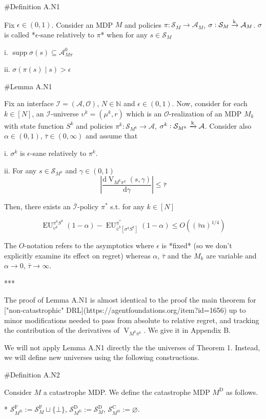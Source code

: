 \documentclass[a4paper]{article}
\DeclareMathOperator{\Supp}{supp}
\newcommand{\AP}[1]{\left(#1\right)}
\newcommand{\AB}[1]{\left[#1\right]}
\newcommand{\D}{\mathrm{d}}
\newcommand{\Nats}{\mathbb{N}}
\newcommand{\Abs}[1]{\left\vert #1 \right\vert}
\newcommand{\M}{\xrightarrow{\textnormal{k}}}
\newcommand{\Ob}{\mathcal{O}}
\newcommand{\A}{\mathcal{A}}
\newcommand{\St}{\mathcal{S}}
\newcommand{\In}{\mathcal{I}}
\newcommand{\Adi}{{\bar{\In}}}
\newcommand{\RMC}{\mathrm{C}}
\newcommand{\RMD}{\mathrm{D}}
\newcommand{\RMF}{\mathrm{F}}
\newcommand{\SF}{\St^{\RMF}}
\newcommand{\SD}{\St^{\RMD}}
\newcommand{\SC}{\St^{\RMC}}
\newcommand{\MD}{M^{\RMD}}
\newcommand{\V}{\operatorname{V}}
\newcommand{\EU}{\operatorname{EU}}
\begin{document}
\#Definition A.N1

Fix $\epsilon\in(0,1)$. Consider an MDP $M$ and policies $\pi: \St_M \rightarrow \A_M$, $\sigma: \St_M \M \A_M$. $\sigma$ is called *$\epsilon$-sane relatively to $\pi$* when for any $s \in \St_M$

i. $\Supp{\sigma(s)} \subseteq \A_{M\pi}^0$

ii. $\sigma\AP{\pi(s) \mid s} > \epsilon$

\#Lemma A.N1

Fix an interface $\In=(\A,\Ob)$, $N \in \Nats$ and $\epsilon \in (0,1)$. Now, consider for each $k \in [N]$, an $\In$-universe $\upsilon^k=(\mu^k,r)$ which is an $\Ob$-realization of an MDP $M_k$ with state function $S^k$ and policies $\pi^k: \St_{M^k} \rightarrow \A$, $\sigma^k: \St_{M^k} \M \A$. Consider also $\alpha\in(0,1)$, $\bar{\tau} \in (0,\infty)$ and assume that 

i. $\sigma^k$ is $\epsilon$-sane relatively to $\pi^k$.

ii. For any $s \in \St_{M^k}$ and $\gamma\in(0,1)$ $$\Abs{\frac{\D\V_{M^k\pi^k}(s,\gamma)}{\D\gamma}} \leq \bar{\tau}$$

Then, there exists an $\Adi$-policy $\pi^*$ s.t. for any $k \in [N]$

$$\EU_{\upsilon^k}^{\pi^k S^k}(1-\alpha) - \EU_{\bar{\upsilon}^k\AB{\sigma^k S^k}}^{\pi^*}(1-\alpha) \leq O\AP{(\bar{\tau} \alpha)^{1/4}}$$

The $O$-notation refers to the asymptotics where $\epsilon$ is *fixed* (so we don't explicitly examine its effect on regret) whereas $\alpha$, $\bar{\tau}$ and the $M_k$ are variable and $\alpha \rightarrow 0$, $\bar{\tau} \rightarrow \infty$.

***

The proof of Lemma A.N1 is almost identical to the proof the main theorem for ["non-catastrophic" DRL](https://agentfoundations.org/item?id=1656) up to minor modifications needed to pass from absolute to relative regret, and tracking the contribution of the derivatives of $\V_{M^k\pi^k}$. We give it in Appendix B.

We will not apply Lemma A.N1 directly the the universes of Theorem 1. Instead, we will define new universes using the following constructions.

\#Definition A.N2

Consider $M$ a catastrophe MDP. We define the catastrophe MDP $\MD$ as follows.

* $\SF_{\MD}:=\SF_M \sqcup \{\bot\}$, $\SD_{\MD}:=\SD_M$, $\SC_{\MD}:=\varnothing$.
\end{document}
